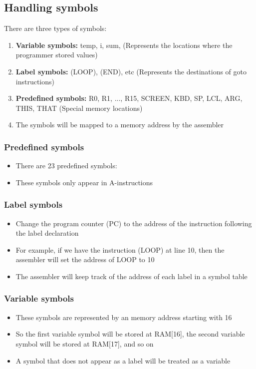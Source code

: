 \documentclass[12pt,a4paper]{article}
\begin{document}
\subsection{Handling symbols}
There are three types of symbols:
\begin{enumerate}
    \item \textbf{Variable symbols:} temp, i, sum, (Represents the locations where the programmer stored values)
    \item \textbf{Label symbols:} (LOOP), (END), etc (Represents the destinations of goto instructions)
    \item \textbf{Predefined symbols:} R0, R1, ..., R15, SCREEN, KBD, SP, LCL, ARG, THIS, THAT (Special memory locations)
    \item The symbols will be mapped to a memory address by the assembler
\end{enumerate}

\subsubsection{Predefined symbols}
\begin{itemize}
    \item There are 23 predefined symbols:
    \item These symbols only appear in A-instructions
\end{itemize}

\subsubsection{Label symbols}
\begin{itemize}
    \item Change the program counter (PC) to the address of the instruction following the label declaration
    \item For example, if we have the instruction (LOOP) at line 10, then the assembler will set the address of LOOP to 10
    \item The assembler will keep track of the address of each label in a symbol table
\end{itemize}

\subsubsection{Variable symbols}
\begin{itemize}
    \item These symbols are represented by an memory address starting with 16
    \item So the first variable symbol will be stored at RAM[16], the second variable symbol will be stored at RAM[17], and so on
    \item A symbol that does not appear as a label will be treated as a variable
\end{itemize}
\end{document}
